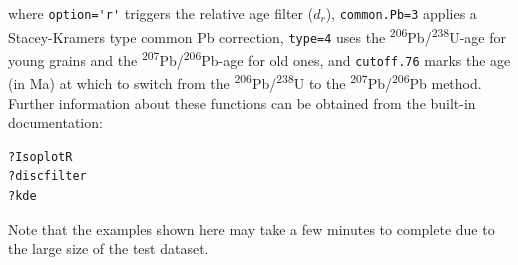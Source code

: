 \documentclass[gchron, manuscript]{copernicus}
\begin{document}
\noindent where \verb|option='r'| triggers the relative age filter
($d_r$), \texttt{common.Pb=3} applies a Stacey-Kramers type common Pb
correction, \texttt{type=4} uses the
\textsuperscript{206}Pb/\textsuperscript{238}U-age for young grains
and the \textsuperscript{207}Pb/\textsuperscript{206}Pb-age for old
ones, and \texttt{cutoff.76} marks the age (in Ma) at which to switch
from the \textsuperscript{206}Pb/\textsuperscript{238}U to the
\textsuperscript{207}Pb/\textsuperscript{206}Pb method. Further
information about these functions can be obtained from the built-in
documentation:

\begin{verbatim}
?IsoplotR
?discfilter
?kde
\end{verbatim}

\noindent Note that the examples shown here may take a few minutes to
complete due to the large size of the test dataset.

\noappendix       %








\end{document}
